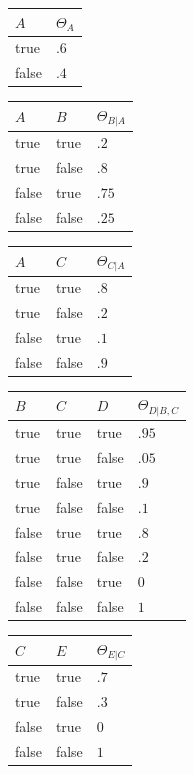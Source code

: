 \documentclass[10pt]{beamer}
\theoremstyle{plain}
\begin{document}
\begin{frame}
  \begin{table}[h]
    \begin{center}
      \begin{tabular}{l | l}
        $A$ & $\Theta_A$\\
        \hline
        true & $.6$ \\
        false & $.4$ \\
      \end{tabular}
      \begin{tabular}{l l | l}
        $A$ & $B$ & $\Theta_{B|A}$\\
        \hline
        true & true & $.2$ \\
        true & false & $.8$ \\
        false & true & $.75$ \\
        false & false & $.25$ \\
      \end{tabular}
      \begin{tabular}{l l | l}
        $A$ & $C$ & $\Theta_{C|A}$ \\
        \hline
        true & true & $.8$ \\
        true & false & $.2$ \\
        false & true & $.1$ \\
        false & false & $.9$ \\
      \end{tabular}
      \begin{tabular}{l l l | l}
        $B$ & $C$ & $D$ & $\Theta_{D|B,C}$ \\
        \hline
        true & true & true & $.95$ \\
        true & true & false & $.05$ \\
        true & false & true & $.9$ \\
        true & false & false & $.1$ \\
        false & true & true & $.8$ \\
        false & true & false & $.2$ \\
        false & false & true & $0$ \\
        false & false & false & $1$ \\
      \end{tabular}
      \begin{tabular}{l l | l}
        $C$ & $E$ & $\Theta_{E|C}$ \\
        \hline
        true & true & $.7$ \\
        true & false & $.3$ \\
        false & true & $0$ \\
        false & false & $1$ \\
      \end{tabular}
    \end{center}
  \end{table}
\end{frame}
\endgroup
\end{document}
